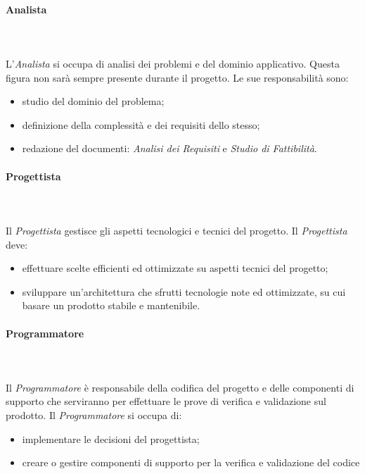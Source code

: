 \paragraph{Analista}\mbox{} \\ \mbox{} \\
L'\textit{Analista} si occupa di analisi dei problemi e del dominio applicativo. Questa figura non sarà sempre presente durante il progetto.
Le sue responsabilità sono:
\begin{itemize}
	\item studio del dominio del problema;
	\item definizione della complessità e dei requisiti dello stesso;
	\item redazione del documenti:\textit{ Analisi dei Requisiti} e \textit{Studio di Fattibilità}.
\end{itemize}

\paragraph{Progettista}\mbox{} \\ \mbox{} \\
Il \textit{Progettista} gestisce gli aspetti tecnologici e tecnici del progetto.
Il \textit{Progettista} deve:
\begin{itemize}
	\item effettuare scelte efficienti ed ottimizzate su aspetti tecnici del progetto;
	\item sviluppare un'architettura che sfrutti tecnologie note ed ottimizzate, su cui basare un prodotto stabile e mantenibile.
\end{itemize}

\paragraph{Programmatore}\mbox{} \\ \mbox{} \\
Il \textit{Programmatore} è responsabile della codifica del progetto e delle componenti di supporto che serviranno per effettuare le prove di verifica e validazione sul prodotto.
Il \textit{Programmatore} si occupa di:
\begin{itemize}
	\item implementare le decisioni del progettista;
	\item creare o gestire componenti di supporto per la verifica e validazione del codice
\end{itemize}

